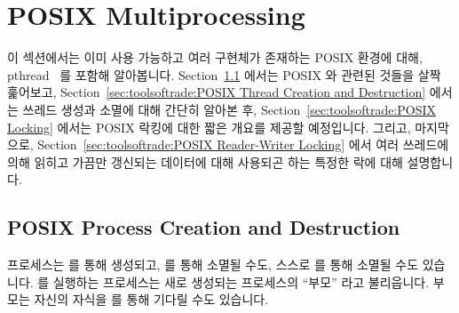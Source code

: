 \section{POSIX Multiprocessing}
\label{sec:toolsoftrade:POSIX Multiprocessing}

이 섹션에서는 이미 사용 가능하고 여러 구현체가 존재하는 POSIX 환경에 대해,
pthread~\cite{OpenGroup1997pthreads} 를 포함해 알아봅니다.
Section~\ref{sec:toolsoftrade:POSIX Process Creation and Destruction}
에서는 POSIX  와 관련된 것들을 살짝 훑어보고,
Section~\ref{sec:toolsoftrade:POSIX Thread Creation and Destruction}
에서는 쓰레드 생성과 소멸에 대해 간단히 알아본 후,
Section~\ref{sec:toolsoftrade:POSIX Locking} 에서는 POSIX 락킹에 대한 짧은
개요를 제공할 예정입니다. 그리고, 마지막으로,
Section~\ref{sec:toolsoftrade:POSIX Reader-Writer Locking} 에서 여러 쓰레드에
의해 읽히고 가끔만 갱신되는 데이터에 대해 사용되곤 하는 특정한 락에 대해
설명합니다.

\subsection{POSIX Process Creation and Destruction}
\label{sec:toolsoftrade:POSIX Process Creation and Destruction}

프로세스는  를 통해 생성되고,  를 통해 소멸될 수도,
스스로  를 통해 소멸될 수도 있습니다.
 를 실행하는 프로세스는 새로 생성되는 프로세스의 ``부모'' 라고
불리웁니다.
부모는 자신의 자식을  를 통해 기다릴 수도 있습니다.

